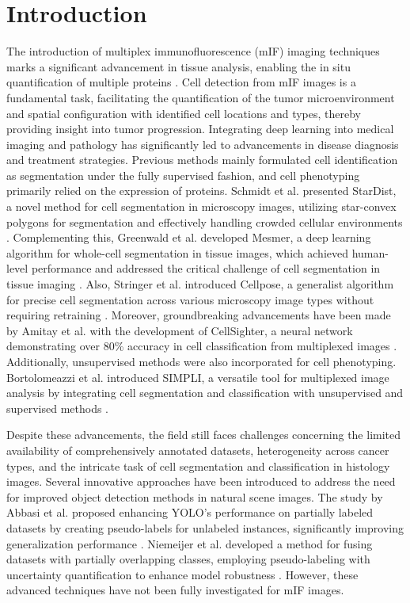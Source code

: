 \documentclass{midl} %
\begin{document}
\section{Introduction}
The introduction of multiplex immunofluorescence (mIF) imaging techniques marks a significant advancement in tissue analysis, enabling the in situ quantification of multiple proteins \cite{amitay2023cellsighter}. Cell detection from mIF images is a fundamental task, facilitating the quantification of the tumor microenvironment and spatial configuration with identified cell locations and types, thereby providing insight into tumor progression. Integrating deep learning into medical imaging and pathology has significantly led to advancements in disease diagnosis and treatment strategies. Previous methods mainly formulated cell identification as segmentation under the fully supervised fashion, and cell phenotyping primarily relied on the expression of proteins. Schmidt et al. presented StarDist, a novel method for cell segmentation in microscopy images, utilizing star-convex polygons for segmentation and effectively handling crowded cellular environments \cite{schmidt2018cell}. Complementing this, Greenwald et al. developed Mesmer, a deep learning algorithm for whole-cell segmentation in tissue images, which achieved human-level performance and addressed the critical challenge of cell segmentation in tissue imaging \cite{greenwald2022whole}. Also, Stringer et al. introduced Cellpose, a generalist algorithm for precise cell segmentation across various microscopy image types without requiring retraining \cite{stringer2021cellpose}. Moreover, groundbreaking advancements have been made by Amitay et al. with the development of CellSighter, a neural network demonstrating over 80\% accuracy in cell classification from multiplexed images \cite{amitay2023cellsighter}. Additionally, unsupervised methods were also incorporated for cell phenotyping. Bortolomeazzi et al. introduced SIMPLI, a versatile tool for multiplexed image analysis by integrating cell segmentation and classification with unsupervised and supervised methods \cite{bortolomeazzi2022simpli}. 

Despite these advancements, the field still faces challenges concerning the limited availability of comprehensively annotated datasets, heterogeneity across cancer types, and the intricate task of cell segmentation and classification in histology images. Several innovative approaches have been introduced to address the need for improved object detection methods in natural scene images. The study by Abbasi et al. proposed enhancing YOLO’s performance on partially labeled datasets by creating pseudo-labels for unlabeled instances, significantly improving generalization performance \cite{abbasi2020self}. Niemeijer et al. developed a method for fusing datasets with partially overlapping classes, employing pseudo-labeling with uncertainty quantification to enhance model robustness \cite{niemeijer2023approach}. However, these advanced techniques have not been fully investigated for mIF images.
\end{document}
